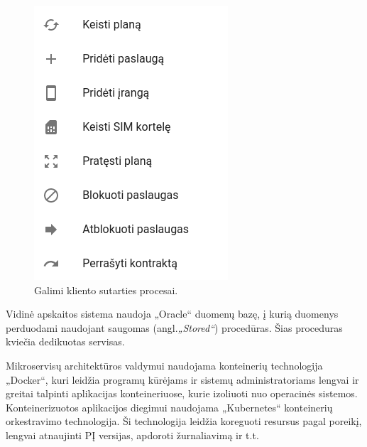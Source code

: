\begin{figure}[H]
    \centering
    \includegraphics[scale=0.4]{img/options.png}
    \caption{Galimi kliento sutarties procesai.}
    \label{img:options}
\end{figure}

Vidinė apskaitos sistema naudoja „Oracle“ duomenų bazę, į kurią duomenys perduodami naudojant saugomas (angl.\textit{„Stored“}) procedūras. Šias proceduras kviečia dedikuotas servisas.

Mikroservisų architektūros valdymui naudojama konteinerių technologija „Docker“, kuri leidžia programų kūrėjams ir sistemų administratoriams lengvai ir greitai
talpinti aplikacijas konteineriuose, kurie izoliuoti nuo operacinės sistemos. Konteinerizuotos aplikacijos diegimui naudojama „Kubernetes“ konteinerių orkestravimo technologija.
Ši technologija leidžia koreguoti resursus pagal poreikį, lengvai atnaujinti PĮ versijas, apdoroti žurnaliavimą ir t.t.